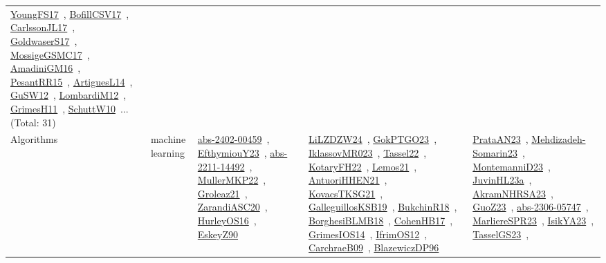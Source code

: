 {\begin{longtable}{lp{3cm}>{\raggedright\arraybackslash}p{6cm}>{\raggedright\arraybackslash}p{6cm}>{\raggedright\arraybackslash}p{8cm}}
\href{../works/YoungFS17.pdf}{YoungFS17}~\cite{YoungFS17}, \href{../works/BofillCSV17.pdf}{BofillCSV17}~\cite{BofillCSV17}, \href{../works/CarlssonJL17.pdf}{CarlssonJL17}~\cite{CarlssonJL17}, \href{../works/GoldwaserS17.pdf}{GoldwaserS17}~\cite{GoldwaserS17}, \href{../works/MossigeGSMC17.pdf}{MossigeGSMC17}~\cite{MossigeGSMC17}, \href{../works/AmadiniGM16.pdf}{AmadiniGM16}~\cite{AmadiniGM16}, \href{../works/PesantRR15.pdf}{PesantRR15}~\cite{PesantRR15}, \href{../works/ArtiguesL14.pdf}{ArtiguesL14}~\cite{ArtiguesL14}, \href{../works/GuSW12.pdf}{GuSW12}~\cite{GuSW12}, \href{../works/LombardiM12.pdf}{LombardiM12}~\cite{LombardiM12}, \href{../works/GrimesH11.pdf}{GrimesH11}~\cite{GrimesH11}, \href{../works/SchuttW10.pdf}{SchuttW10}~\cite{SchuttW10}... (Total: 31)\\
\index{machine learning}\index{Algorithms!machine learning}Algorithms & machine learning & \href{../works/abs-2402-00459.pdf}{abs-2402-00459}~\cite{abs-2402-00459}, \href{../works/EfthymiouY23.pdf}{EfthymiouY23}~\cite{EfthymiouY23}, \href{../works/abs-2211-14492.pdf}{abs-2211-14492}~\cite{abs-2211-14492}, \href{../works/MullerMKP22.pdf}{MullerMKP22}~\cite{MullerMKP22}, \href{../works/Groleaz21.pdf}{Groleaz21}~\cite{Groleaz21}, \href{../works/ZarandiASC20.pdf}{ZarandiASC20}~\cite{ZarandiASC20}, \href{../works/HurleyOS16.pdf}{HurleyOS16}~\cite{HurleyOS16}, \href{../works/EskeyZ90.pdf}{EskeyZ90}~\cite{EskeyZ90} & \href{../works/LiLZDZW24.pdf}{LiLZDZW24}~\cite{LiLZDZW24}, \href{../works/GokPTGO23.pdf}{GokPTGO23}~\cite{GokPTGO23}, \href{../works/IklassovMR023.pdf}{IklassovMR023}~\cite{IklassovMR023}, \href{../works/Tassel22.pdf}{Tassel22}~\cite{Tassel22}, \href{../works/KotaryFH22.pdf}{KotaryFH22}~\cite{KotaryFH22}, \href{../works/Lemos21.pdf}{Lemos21}~\cite{Lemos21}, \href{../works/AntuoriHHEN21.pdf}{AntuoriHHEN21}~\cite{AntuoriHHEN21}, \href{../works/KovacsTKSG21.pdf}{KovacsTKSG21}~\cite{KovacsTKSG21}, \href{../works/GalleguillosKSB19.pdf}{GalleguillosKSB19}~\cite{GalleguillosKSB19}, \href{../works/BukchinR18.pdf}{BukchinR18}~\cite{BukchinR18}, \href{../works/BorghesiBLMB18.pdf}{BorghesiBLMB18}~\cite{BorghesiBLMB18}, \href{../works/CohenHB17.pdf}{CohenHB17}~\cite{CohenHB17}, \href{../works/GrimesIOS14.pdf}{GrimesIOS14}~\cite{GrimesIOS14}, \href{../works/IfrimOS12.pdf}{IfrimOS12}~\cite{IfrimOS12}, \href{../works/CarchraeB09.pdf}{CarchraeB09}~\cite{CarchraeB09}, \href{../works/BlazewiczDP96.pdf}{BlazewiczDP96}~\cite{BlazewiczDP96} & \href{../works/PrataAN23.pdf}{PrataAN23}~\cite{PrataAN23}, \href{../works/Mehdizadeh-Somarin23.pdf}{Mehdizadeh-Somarin23}~\cite{Mehdizadeh-Somarin23}, \href{../works/MontemanniD23.pdf}{MontemanniD23}~\cite{MontemanniD23}, \href{../works/JuvinHL23a.pdf}{JuvinHL23a}~\cite{JuvinHL23a}, \href{../works/AkramNHRSA23.pdf}{AkramNHRSA23}~\cite{AkramNHRSA23}, \href{../works/GuoZ23.pdf}{GuoZ23}~\cite{GuoZ23}, \href{../works/abs-2306-05747.pdf}{abs-2306-05747}~\cite{abs-2306-05747}, \href{../works/MarliereSPR23.pdf}{MarliereSPR23}~\cite{MarliereSPR23}, \href{../works/IsikYA23.pdf}{IsikYA23}~\cite{IsikYA23}, \href{../works/TasselGS23.pdf}{TasselGS23}~\cite{TasselGS23}, 
\end{longtable}}
